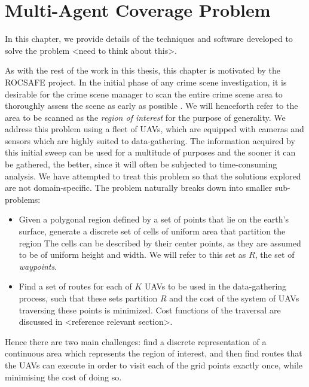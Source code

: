 \chapter{Multi-Agent Coverage Problem}
In this chapter, we provide details of the techniques and software developed to solve the problem <need to think about this>.

As with the rest of the work in this thesis, this chapter is motivated by the ROCSAFE project. In the initial phase of any crime scene investigation, it is desirable for the crime scene manager to scan the entire crime scene area to thoroughly assess the scene as early as possible \cite{TechnicalWorkingGrouponCrimeSceneInvestigation2013CrimeEnforcement}. We will henceforth refer to the area to be scanned as the \textit{region of interest} for the purpose of generality. We address this problem using a fleet of UAVs, which are equipped with cameras and sensors which are highly suited to data-gathering. The information acquired by this initial sweep can be used for a multitude of purposes and the sooner it can be gathered, the better, since it will often be subjected to time-consuming analysis. We have attempted to treat this problem so that the solutions explored are not domain-specific. The problem naturally breaks down into smaller sub-problems:
\begin{itemize}
    \item Given a polygonal region defined by a set of points that lie on the earth's surface, generate a discrete set of cells of uniform area that partition the region 
    The cells can be described by their center points, as they are assumed to be of uniform height and width. We will refer to this set as $R$, the set of \textit{waypoints}.
    \item Find a set of routes for each of $K$ UAVs to be used in the data-gathering process, such that these sets partition $R$ and the cost of the system of UAVs traversing these points is minimized. Cost functions of the traversal are discussed in <reference relevant section>.
\end{itemize}

Hence there are two main challenges: find a discrete representation of a continuous area which represents the region of interest, and then find routes that the UAVs can execute in order to visit each of the grid points exactly once, while minimising the cost of doing so.









